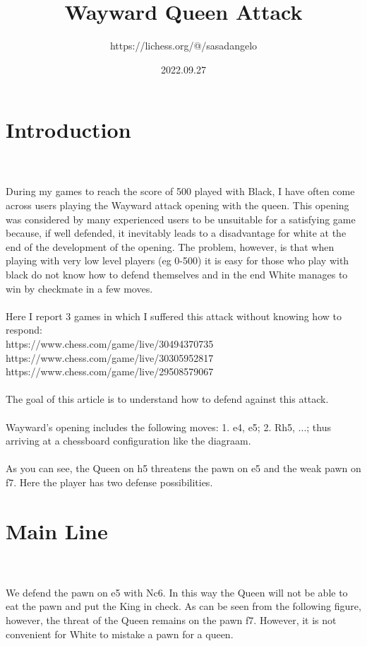 \documentclass{article}
\title{Wayward Queen Attack}
\author{https://lichess.org/@/sasadangelo}
\date{2022.09.27}
\begin{document}
\begin{titlepage}
\maketitle
\end{titlepage}
\section{ Introduction}

\\
\\
During my games to reach the score of 500 played with Black, I have often come across users playing the Wayward attack opening with the queen. This opening was considered by many experienced users to be unsuitable for a satisfying game because, if well defended, it inevitably leads to a disadvantage for white at the end of the development of the opening. The problem, however, is that when playing with very low level players (eg 0-500) it is easy for those who play with black do not know how to defend themselves and in the end White manages to win by checkmate in a few moves.\\\\Here I report 3 games in which I suffered this attack without knowing how to respond:\\https://www.chess.com/game/live/30494370735\\https://www.chess.com/game/live/30305952817\\https://www.chess.com/game/live/29508579067\\\\The goal of this article is to understand how to defend against this attack.\\\\Wayward's opening includes the following moves: 1. e4, e5; 2. Rh5, ...; thus arriving at a chessboard configuration like the diagraam.\\\\As you can see, the Queen on h5 threatens the pawn on e5 and the weak pawn on f7. Here the player has two defense possibilities.\section{ Main Line}

\\
\\
We defend the pawn on e5 with Nc6. In this way the Queen will not be able to eat the pawn and put the King in check. As can be seen from the following figure, however, the threat of the Queen remains on the pawn f7. However, it is not convenient for White to mistake a pawn for a queen.\\\\
\end{document}
